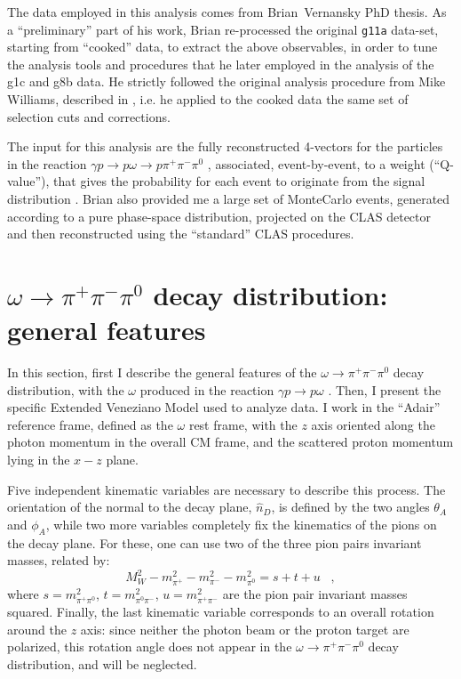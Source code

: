 \documentclass[a4paper,10pt]{report}
\newcommand{\decay}{$\omega \rightarrow \pi^+ \pi^- \pi^0$ }
\newcommand{\production}{$\gamma p \rightarrow p \omega$ }
\newcommand{\fullreaction}{$\gamma p \rightarrow p \omega \rightarrow p \pi^+ \pi^- \pi^{0}$ }
\begin{document}
The data employed in this analysis comes from Brian~Vernansky PhD thesis.
As a ``preliminary'' part of his work, Brian re-processed the original \texttt{g11a} data-set, starting from ``cooked'' data, to extract the above observables,
in order to tune the analysis tools and procedures that he later employed in the analysis of the g1c and g8b data. He strictly followed the original analysis procedure from Mike Williams, described in 
\cite{Williams:thesis}, i.e. he applied to the cooked data the same set of selection cuts and corrections.

The input for this analysis are the fully reconstructed 4-vectors for the particles in the reaction \fullreaction, associated, event-by-event, 
to a weight (``Q-value''), that gives the probability for each event to originate from the signal distribution \cite{Williams:2008ac}. 
Brian also provided me a large set of MonteCarlo events, generated according to a pure phase-space distribution, projected on the CLAS detector and then reconstructed using the ``standard'' CLAS procedures. 


\section{\decay decay distribution: general features}
In this section, first I describe the general features of the \decay decay distribution, with the $\omega$ produced in the reaction \production.
Then, I present the specific Extended Veneziano Model used to analyze data.
I work in the ``Adair'' reference frame, defined as the $\omega$ rest frame, with the $z$ axis oriented along the photon momentum in the overall CM frame, and the scattered proton momentum lying in the $x-z$ plane.

Five independent kinematic variables are necessary to describe this process. The orientation of the normal to the decay plane, $\hat{n}_D$, is defined by the two angles $\theta_A$ and $\phi_A$, while two more variables completely fix the kinematics
of the pions on the decay plane. For these, one can use two of the three pion pairs invariant masses, related by:
\begin{equation}
M_W^2-m^2_{\pi^+} -m^2_{\pi^-} - m^2_{\pi^0} = s + t + u \; \; \; ,
\end{equation}
where $s=m^2_{\pi^+ \pi^0}$, $t=m^2_{\pi^0 \pi^-}$, $u=m^2_{\pi^+ \pi^-}$ are the pion pair invariant masses squared. Finally, the last kinematic variable corresponds to an overall rotation around the $z$ axis: since neither the photon beam or the proton target are polarized,
this rotation angle does not appear in the \decay decay distribution, and will be neglected.
\end{document}
